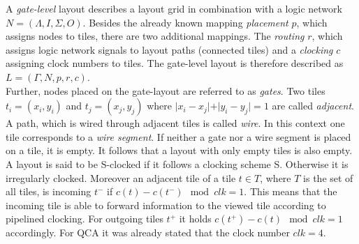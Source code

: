 \begin{definition}
	A \textit{gate-level} layout describes a layout grid in combination with a logic network $N = (\Lambda, I, \Sigma, O)$. Besides the already known mapping \textit{placement} $p$, which assigns nodes to tiles, there are two additional mappings. The \textit{routing} $r$, which assigns logic network signals to layout paths (connected tiles) and a \textit{clocking} $c$ assigning clock numbers to tiles. The gate-level layout is therefore described as $L = (\Gamma, N, p, r, c)$.\\
	Further, nodes placed on the gate-layout are referred to as \textit{gates}. Two tiles $t_i = (x_i, y_i)$ and $t_j = (x_j, y_j)$ where $\vert x_i-x_j\vert+\vert y_i-y_j\vert = 1$ are called \textit{adjacent}. A path, which is wired through adjacent tiles is called \textit{wire}. In this context one tile corresponds to a \textit{wire segment}. If neither a gate nor a wire segment is placed on a tile, it is empty. It follows that a layout with only empty tiles is also empty. A layout is said to be S-clocked if it follows a clocking scheme S. Otherwise it is irregularly clocked. Moreover an adjacent tile of a tile $t \in T$, where $T$ is the set of all tiles, is incoming $t^-$ if $c(t) - c(t^-) \mod{clk} = 1$. This means that the incoming tile is able to forward information to the viewed tile according to pipelined clocking. For outgoing tiles $t^+$ it holds $c(t^+) - c(t) \mod{clk} = 1$ accordingly. For QCA it was already stated that the clock number $clk = 4$.\\
\end{definition}

